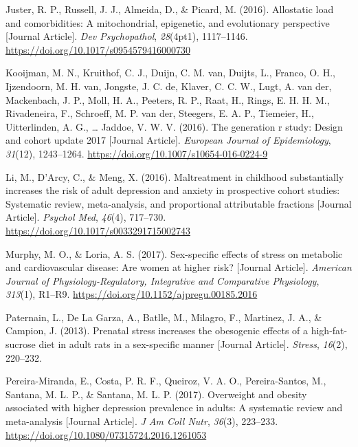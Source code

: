 \documentclass[
  letterpaper,
  DIV=11,
  numbers=noendperiod]{scrreport}
\newlength{\cslhangindent}
\newenvironment{CSLReferences}[2] %
 {\begin{list}{}{%
  \setlength{\itemindent}{0pt}
  \setlength{\leftmargin}{0pt}
  \setlength{\parsep}{0pt}
  \ifodd #1
   \setlength{\leftmargin}{\cslhangindent}
   \setlength{\itemindent}{-1\cslhangindent}
  \fi
  \setlength{\itemsep}{#2\baselineskip}}}
 {\end{list}}
\begin{document}
\begin{CSLReferences}{1}{0}
Juster, R. P., Russell, J. J., Almeida, D., \& Picard, M. (2016).
Allostatic load and comorbidities: A mitochondrial, epigenetic, and
evolutionary perspective {[}Journal Article{]}. \emph{Dev Psychopathol},
\emph{28}(4pt1), 1117--1146.
\url{https://doi.org/10.1017/s0954579416000730}

Kooijman, M. N., Kruithof, C. J., Duijn, C. M. van, Duijts, L., Franco,
O. H., Ijzendoorn, M. H. van, Jongste, J. C. de, Klaver, C. C. W., Lugt,
A. van der, Mackenbach, J. P., Moll, H. A., Peeters, R. P., Raat, H.,
Rings, E. H. H. M., Rivadeneira, F., Schroeff, M. P. van der, Steegers,
E. A. P., Tiemeier, H., Uitterlinden, A. G., \ldots{} Jaddoe, V. W. V.
(2016). The generation r study: Design and cohort update 2017 {[}Journal
Article{]}. \emph{European Journal of Epidemiology}, \emph{31}(12),
1243--1264. \url{https://doi.org/10.1007/s10654-016-0224-9}

Li, M., D'Arcy, C., \& Meng, X. (2016). Maltreatment in childhood
substantially increases the risk of adult depression and anxiety in
prospective cohort studies: Systematic review, meta-analysis, and
proportional attributable fractions {[}Journal Article{]}. \emph{Psychol
Med}, \emph{46}(4), 717--730.
\url{https://doi.org/10.1017/s0033291715002743}

Murphy, M. O., \& Loria, A. S. (2017). Sex-specific effects of stress on
metabolic and cardiovascular disease: Are women at higher risk?
{[}Journal Article{]}. \emph{American Journal of Physiology-Regulatory,
Integrative and Comparative Physiology}, \emph{313}(1), R1--R9.
\url{https://doi.org/10.1152/ajpregu.00185.2016}

Paternain, L., De La Garza, A., Batlle, M., Milagro, F., Martinez, J.
A., \& Campion, J. (2013). Prenatal stress increases the obesogenic
effects of a high-fat-sucrose diet in adult rats in a sex-specific
manner {[}Journal Article{]}. \emph{Stress}, \emph{16}(2), 220--232.

Pereira-Miranda, E., Costa, P. R. F., Queiroz, V. A. O., Pereira-Santos,
M., Santana, M. L. P., \& Santana, M. L. P. (2017). Overweight and
obesity associated with higher depression prevalence in adults: A
systematic review and meta-analysis {[}Journal Article{]}. \emph{J Am
Coll Nutr}, \emph{36}(3), 223--233.
\url{https://doi.org/10.1080/07315724.2016.1261053}


\end{CSLReferences}
\end{document}
